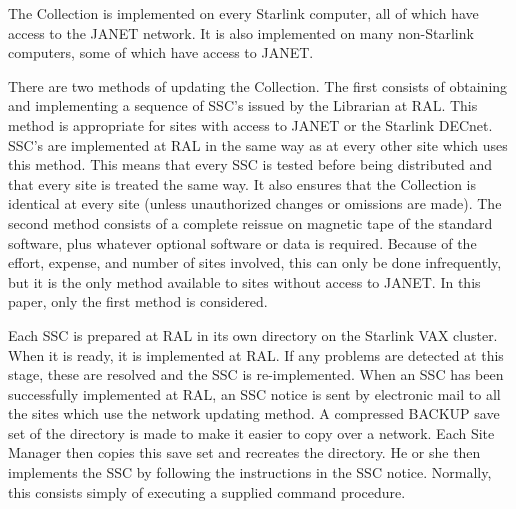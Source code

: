 The Collection is implemented on every Starlink computer, all of which have
access to the JANET network.
It is also implemented on many non-Starlink computers, some of which have access
to JANET.

There are two methods of updating the Collection.
The first consists of obtaining and implementing a sequence of SSC's issued by
the Librarian at RAL.
This method is appropriate for sites with access to JANET or the Starlink
DECnet.
SSC's are implemented at RAL in the same way as at every other site which uses
this method.
This means that every SSC is tested before being distributed and that every site
is treated the same way.
It also ensures that the Collection is identical at every site (unless
unauthorized changes or omissions are made).
The second method consists of a complete reissue on magnetic tape of the
standard software, plus whatever optional software or data is required.
Because of the effort, expense, and number of sites involved, this can only be
done infrequently, but it is the only method available to sites without access
to JANET.
In this paper, only the first method is considered.

Each SSC is prepared at RAL in its own directory on the Starlink VAX cluster.
When it is ready, it is implemented at RAL.
If any problems are detected at this stage, these are resolved and the SSC is
re-implemented.
When an SSC has been successfully implemented at RAL, an SSC notice is sent
by electronic mail to all the sites which use the network updating method.
A compressed BACKUP save set of the directory is made to make it easier to copy
over a network.
Each Site Manager then copies this save set and recreates the directory.
He or she then implements the SSC by following the instructions in the SSC
notice.
Normally, this consists simply of executing a supplied command procedure.

